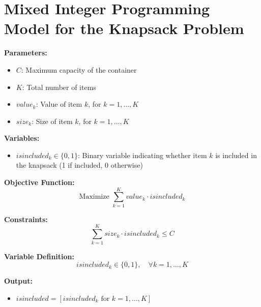\documentclass{article}
\begin{document}
\section*{Mixed Integer Programming Model for the Knapsack Problem}

\textbf{Parameters:}
\begin{itemize}
    \item $C$: Maximum capacity of the container
    \item $K$: Total number of items
    \item $value_k$: Value of item $k$, for $k = 1, \ldots, K$
    \item $size_k$: Size of item $k$, for $k = 1, \ldots, K$
\end{itemize}

\textbf{Variables:}
\begin{itemize}
    \item $isincluded_k \in \{0, 1\}$: Binary variable indicating whether item $k$ is included in the knapsack (1 if included, 0 otherwise)
\end{itemize}

\textbf{Objective Function:}
\[
\text{Maximize } \sum_{k=1}^{K} value_k \cdot isincluded_k
\]

\textbf{Constraints:}
\[
\sum_{k=1}^{K} size_k \cdot isincluded_k \leq C
\]

\textbf{Variable Definition:}
\[
isincluded_k \in \{0, 1\}, \quad \forall k = 1, \ldots, K
\]

\textbf{Output:}
\begin{itemize}
    \item $isincluded = [isincluded_k \text{ for } k = 1, \ldots, K]$
\end{itemize}
\end{document}

